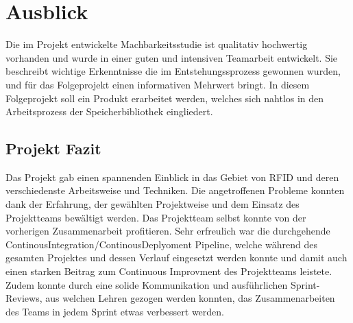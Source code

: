 \chapter{Ausblick}
\label{ch:Ausblick}
Die im Projekt entwickelte Machbarkeitsstudie ist qualitativ hochwertig vorhanden und wurde in einer guten und intensiven Teamarbeit entwickelt. Sie beschreibt wichtige Erkenntnisse die im Entstehungssprozess gewonnen wurden, und für das Folgeprojekt einen informativen Mehrwert bringt. In diesem Folgeprojekt soll ein Produkt erarbeitet werden, welches sich nahtlos in den Arbeitsprozess der Speicherbibliothek eingliedert.

\section{Projekt Fazit}
Das Projekt gab einen spannenden Einblick in das Gebiet von RFID und deren verschiedenste Arbeitsweise und Techniken. Die angetroffenen Probleme konnten dank der Erfahrung, der gewählten Projektweise und dem Einsatz des Projektteams bewältigt werden. Das Projektteam selbst konnte von der vorherigen Zusammenarbeit profitieren. Sehr erfreulich war die durchgehende ContinousIntegration/ContinousDeplyoment Pipeline, welche während des gesamten Projektes und dessen Verlauf eingesetzt werden konnte und damit auch einen starken Beitrag zum Continuous Improvment des Projektteams leistete. Zudem konnte durch eine solide Kommunikation und ausführlichen Sprint-Reviews, aus welchen Lehren gezogen werden konnten, das Zusammenarbeiten des Teams in jedem Sprint etwas verbessert werden.
